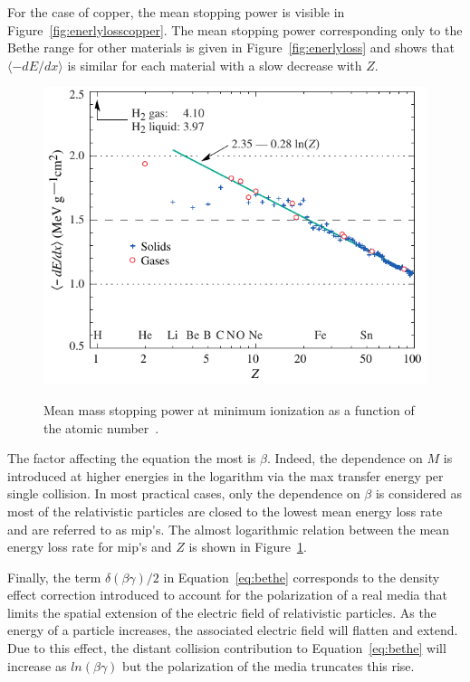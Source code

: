 	For the case of copper, the mean stopping power is visible in Figure~\ref{fig:enerlylosscopper}. The mean stopping power corresponding only to the Bethe range for other materials is given in Figure~\ref{fig:enerlyloss} and shows that $\langle-dE/dx\rangle$ is similar for each material with a slow decrease with $Z$.
	
\endgroup
	
\begingroup\setlength{\intextsep}{0pt}\setlength{\columnsep}{15pt}
	
	\begin{figure}
		\centering
		\includegraphics[width = \linewidth]{fig/chapt3/dedx_min_06.pdf}\\
		\caption{\label{fig:miplossrate} Mean mass stopping power at minimum ionization as a function of the atomic number~\cite{PDG2018}.}
	\end{figure}
	
	The factor affecting the equation the most is $\beta$. Indeed, the dependence on $M$ is introduced at higher energies in the logarithm via the max transfer energy per single collision. In most practical cases, only the dependence on $\beta$ is considered as most of the relativistic particles are closed to the lowest mean energy loss rate and are referred to as \acf{mip's}. The almost logarithmic relation between the mean energy loss rate for \acl{mip's} and $Z$ is shown in Figure~\ref{fig:miplossrate}.
	
	Finally, the term $\delta(\beta\gamma)/2$ in Equation~\ref{eq:bethe} corresponds to the density effect correction introduced to account for the polarization of a real media that limits the spatial extension of the electric field of relativistic particles. As the energy of a particle increases, the associated electric field will flatten and extend. Due to this effect, the distant collision contribution to Equation~\ref{eq:bethe} will increase as $ln(\beta\gamma)$ but the polarization of the media truncates this rise.
	
